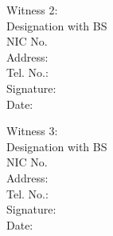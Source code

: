 \documentclass{article}
\begin{document}
Witness 2: \\
Designation with BS \hrulefill \\
NIC No. \hrulefill \\
Address: \hrulefill \\
Tel. No.: \hrulefill \\
Signature: \hrulefill \\
Date: \hrulefill \\

\vspace{0.5cm}

Witness 3: \\
Designation with BS \hrulefill \\
NIC No. \hrulefill \\
Address: \hrulefill \\
Tel. No.: \hrulefill \\
Signature: \hrulefill \\
Date: \hrulefill \\
\end{document}
